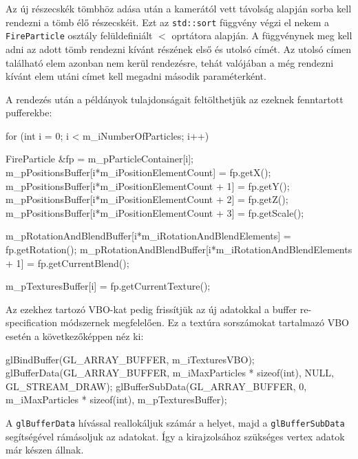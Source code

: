 Az új részecskék tömbhöz adása után a kamerától vett távolság alapján sorba kell rendezni a tömb élő részecskéit. Ezt az \texttt{std::sort} függvény végzi el nekem a \texttt{FireParticle} osztály felüldefiniált $<$ oprtátora alapján. A függvénynek meg kell adni az adott tömb rendezni kívánt részének első és utolsó címét. Az utolsó címen található elem azonban nem kerül rendezésre, tehát valójában a még rendezni kívánt elem utáni címet kell megadni második paraméterként.

A rendezés után a példányok tulajdonságait feltölthetjük az ezeknek fenntartott pufferekbe:
\begin{cpp}
for (int i = 0; i < m_iNumberOfParticles; i++)
{
	FireParticle &fp = m_pParticleContainer[i];
	m_pPositionsBuffer[i*m_iPositionElementCount] = fp.getX();
	m_pPositionsBuffer[i*m_iPositionElementCount + 1] = fp.getY();
	m_pPositionsBuffer[i*m_iPositionElementCount + 2] = fp.getZ();
	m_pPositionsBuffer[i*m_iPositionElementCount + 3] = fp.getScale();

	m_pRotationAndBlendBuffer[i*m_iRotationAndBlendElements] = 
						fp.getRotation();
	m_pRotationAndBlendBuffer[i*m_iRotationAndBlendElements + 1] = 
						fp.getCurrentBlend();

	m_pTexturesBuffer[i] = fp.getCurrentTexture();
}
\end{cpp}
Az ezekhez tartozó VBO-kat pedig frissítjük az új adatokkal a buffer re-specification módszernek megfelelően. Ez a textúra sorszámokat tartalmazó VBO esetén a következőképpen néz ki:
\begin{cpp}
glBindBuffer(GL_ARRAY_BUFFER, m_iTexturesVBO);
glBufferData(GL_ARRAY_BUFFER, m_iMaxParticles * sizeof(int), 
			NULL, GL_STREAM_DRAW);
glBufferSubData(GL_ARRAY_BUFFER, 0, m_iMaxParticles * sizeof(int), 
			m_pTexturesBuffer);
\end{cpp}
A \texttt{glBufferData} hívással reallokáljuk számár a helyet, majd a \texttt{glBufferSubData} segítségével rámásoljuk az adatokat. Így a kirajzolsához szükséges vertex adatok már készen állnak.
















